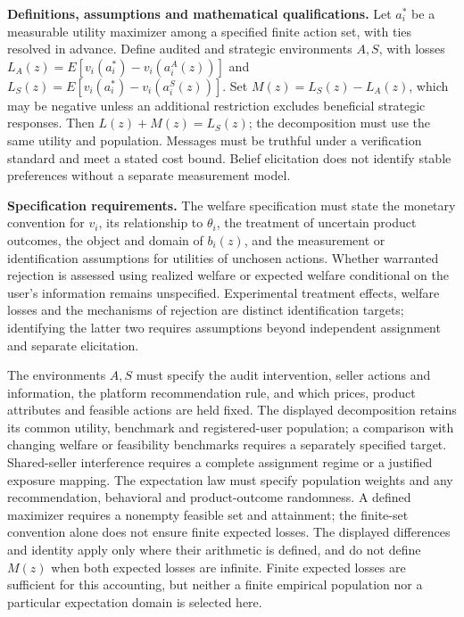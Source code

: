\documentclass[11pt,a4paper]{article}
\begin{document}
\textbf{Definitions, assumptions and mathematical qualifications.} Let \(a_i^*\) be a measurable utility maximizer among a specified finite action set, with ties resolved in advance. Define audited and strategic environments \(A,S\), with losses \(L_A(z)=E[v_i(a_i^*)-v_i(a_i^A(z))]\) and \(L_S(z)=E[v_i(a_i^*)-v_i(a_i^S(z))]\). Set \(M(z)=L_S(z)-L_A(z)\), which may be negative unless an additional restriction excludes beneficial strategic responses. Then \(L(z)+M(z)=L_S(z)\); the decomposition must use the same utility and population. Messages must be truthful under a verification standard and meet a stated cost bound. Belief elicitation does not identify stable preferences without a separate measurement model.

\textbf{Specification requirements.} The welfare specification must state the monetary convention for \(v_i\), its relationship to \(\theta_i\), the treatment of uncertain product outcomes, the object and domain of \(b_i(z)\), and the measurement or identification assumptions for utilities of unchosen actions. Whether warranted rejection is assessed using realized welfare or expected welfare conditional on the user's information remains unspecified. Experimental treatment effects, welfare losses and the mechanisms of rejection are distinct identification targets; identifying the latter two requires assumptions beyond independent assignment and separate elicitation.

The environments \(A,S\) must specify the audit intervention, seller actions and information, the platform recommendation rule, and which prices, product attributes and feasible actions are held fixed. The displayed decomposition retains its common utility, benchmark and registered-user population; a comparison with changing welfare or feasibility benchmarks requires a separately specified target. Shared-seller interference requires a complete assignment regime or a justified exposure mapping. The expectation law must specify population weights and any recommendation, behavioral and product-outcome randomness. A defined maximizer requires a nonempty feasible set and attainment; the finite-set convention alone does not ensure finite expected losses. The displayed differences and identity apply only where their arithmetic is defined, and do not define \(M(z)\) when both expected losses are infinite. Finite expected losses are sufficient for this accounting, but neither a finite empirical population nor a particular expectation domain is selected here.
\end{document}
